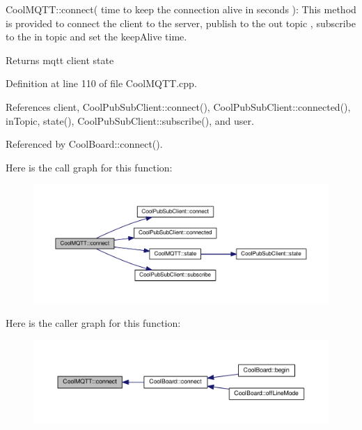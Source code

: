 Cool\+M\+Q\+T\+T\+::connect( time to keep the connection alive in seconds )\+: This method is provided to connect the client to the server, publish to the out topic , subscribe to the in topic and set the keep\+Alive time.

\begin{DoxyReturn}{Returns}
mqtt client state 
\end{DoxyReturn}


Definition at line 110 of file Cool\+M\+Q\+T\+T.\+cpp.



References client, Cool\+Pub\+Sub\+Client\+::connect(), Cool\+Pub\+Sub\+Client\+::connected(), in\+Topic, state(), Cool\+Pub\+Sub\+Client\+::subscribe(), and user.



Referenced by Cool\+Board\+::connect().

Here is the call graph for this function\+:\nopagebreak
\begin{figure}[H]
\begin{center}
\leavevmode
\includegraphics[width=350pt]{d0/dd0/class_cool_m_q_t_t_a50075d0ab23a327ab897fd6adad20eda_cgraph}
\end{center}
\end{figure}
Here is the caller graph for this function\+:\nopagebreak
\begin{figure}[H]
\begin{center}
\leavevmode
\includegraphics[width=350pt]{d0/dd0/class_cool_m_q_t_t_a50075d0ab23a327ab897fd6adad20eda_icgraph}
\end{center}
\end{figure}
\mbox{\label{class_cool_m_q_t_t_ace977b3e90ab14b1199fe5c4fb0a13ec}} 
